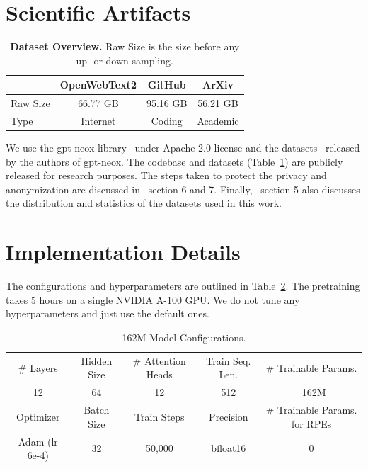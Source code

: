 \documentclass[11pt]{article}
\theoremstyle{plain}
\begin{document}
\section{Scientific Artifacts}
\label{sec:artifact}
\begin{table}[!ht]
    \centering
    \begin{tabular}{lccc}
    \hline\hline
    & OpenWebText2 & GitHub & ArXiv\\ \hline
    Raw Size & 66.77 GB & 95.16 GB & 56.21 GB\\
    Type & Internet & Coding & Academic\\
    \hline\hline
    \end{tabular}
    \caption{\textbf{Dataset Overview.} Raw Size is the size before any up- or down-sampling.}
    \label{tab:dataset}
\end{table}
We use the gpt-neox library~\cite{gpt-neox-library} under Apache-2.0 license and the datasets~\cite{pile} released by the authors of gpt-neox. The codebase and datasets (Table~\ref{tab:dataset}) are publicly released for research purposes. The steps taken to protect the privacy and anonymization are discussed in~\citet{pile} section 6 and 7. Finally,~\citet{pile} section 5 also discusses the distribution and statistics of the datasets used in this work.

\section{Implementation Details}
\label{sec:implementation_details}
The configurations and hyperparameters are outlined in Table~\ref{tab:model_configs}. The pretraining takes 5 hours on a single NVIDIA A-100 GPU. We do not tune any hyperparameters and just use the default ones.
\begin{table}[!ht]
    \centering
    \setlength{\tabcolsep}{3pt}
    \begin{tabular}{ccccc}
        \hline\hline
         \# Layers & Hidden Size & \# Attention Heads & Train Seq. Len. & \# Trainable Params.\\
         12 & 64 & 12 & 512 & ~162M\\ \hline
         Optimizer & Batch Size & Train Steps & Precision & \# Trainable Params. for RPEs\\
         Adam (lr 6e-4) & 32 & 50,000 & bfloat16 & 0\\
         \hline\hline
    \end{tabular}
    \caption{162M Model Configurations.}
    \label{tab:model_configs}
\end{table}
\end{document}
